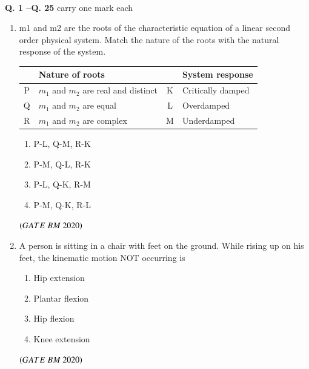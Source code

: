 \documentclass[journal,12pt,onecolumn]{IEEEtran}
\theoremstyle{remark}
\begin{document}
 \newpage
{}\\
  \noindent \textbf{Q. 1 --Q.  \textbf{25}} carry one mark each
\begin{enumerate}

\item m1 and m2 are the roots of the characteristic equation of a linear second order physical system. Match the nature of the roots with the natural response of the system.\\

\begin{center}
\begin{tabular}{|c|l|c|l|}
\hline
\textbf{} & \textbf{Nature of roots} & \textbf{} & \textbf{System response} \\
\hline
P & $m_1$ and $m_2$ are real and distinct & K & Critically damped \\
\hline
Q & $m_1$ and $m_2$ are equal & L & Overdamped \\
\hline
R & $m_1$ and $m_2$ are complex & M & Underdamped \\
\hline
\end{tabular}
\end{center}

\begin{enumerate}
\item\hspace{0.5cm}P-L, Q-M, R-K
\item\hspace{0.5cm}P-M, Q-L, R-K
\item\hspace{0.5cm}P-L, Q-K, R-M
\item\hspace{0.5cm}P-M, Q-K, R-L
\end{enumerate}
 \hfill $\left(GATE\ BM\ 2020\right)$

\item A person is sitting in a chair with feet on the ground. While rising up on his feet, the kinematic motion NOT occurring is
\begin{enumerate}[label=\alph*)]
\item\hspace{0.5cm}Hip extension
\item\hspace{0.5cm}Plantar flexion
\item\hspace{0.5cm}Hip flexion
\item\hspace{0.5cm}Knee extension
\end{enumerate}
 \hfill $\left(GATE\ BM\ 2020\right)$
 

\end{enumerate}
\end{document}
